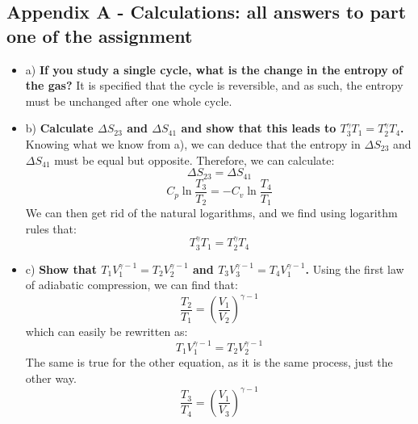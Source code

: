 \documentclass{article}
\begin{document}
\subsection*{Appendix A - Calculations: all answers to part one of the assignment}
\begin{itemize}
    \item a) \textbf{If you study a single cycle, what is the change in the
entropy of the gas?}
\newline It is specified that the cycle is reversible, and as such, the entropy must be unchanged after one whole cycle.
    \item b) \textbf{Calculate $\Delta S_{23}$ and $\Delta S_{41}$ and show that this leads to $T_3^\gamma T_1 = T_2^\gamma T_4$.} 
    \newline Knowing what we know from a), we can deduce that the entropy in $\Delta S_{23}$ and $\Delta S_{41}$ must be equal but opposite. Therefore, we can calculate:
    \begin{equation*}
        \Delta S_{23} = \Delta S_{41}
    \end{equation*}
    \begin{equation*}
        C_p \ln{\frac{T_3}{T_2}} = -C_v \ln{\frac{T_4}{T_1}}
    \end{equation*}
    \newline
    We can then get rid of the natural logarithms, and we find using logarithm rules that:
    \begin{equation*}
        T_3^\gamma T_1 = T_2^\gamma T_4
    \end{equation*}
    \item c) \textbf{Show that $T_1 V_1^{\gamma -1} = T_2 V_2^{\gamma -1}$ and $T_3 V_3^{\gamma -1} = T_4 V_1^{\gamma -1}$.}
    \newline Using the first law of adiabatic compression, we can find that:
    \begin{equation*}
        \frac{T_2}{T_1} = \left(\frac{V_1}{V_2} \right)^{\gamma -1}
    \end{equation*}
    which can easily be rewritten as:
    \begin{equation*}
        T_1 V_1^{\gamma -1} = T_2 V_2^{\gamma -1}
    \end{equation*}
    The same is true for the other equation, as it is the same process, just the other way.
    \begin{equation*}
        \frac{T_3}{T_4} = \left(\frac{V_1}{V_3} \right)^{\gamma -1}
    \end{equation*}
    \begin{equation*}

\end{equation*}
\end{itemize}
\end{document}
